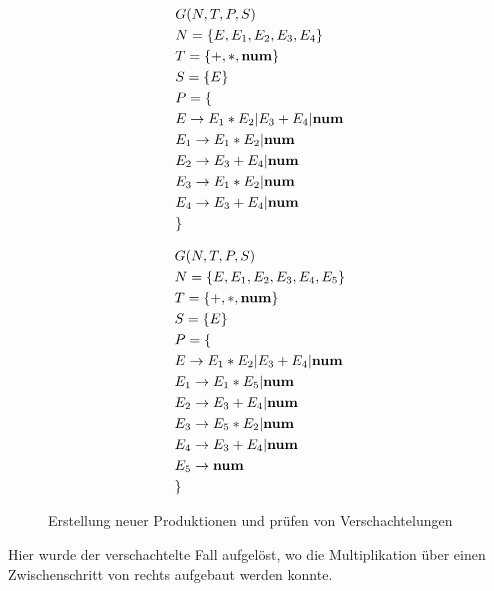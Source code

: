 \documentclass[runningheads]{llncs}
\begin{document}
	\begin{figure}
		\begin{minipage}{0.48\textwidth}
			\begin{flushleft}
				\begin{align*}
					& G(N,T,P,S) \\
					& N= \{E, E_1, E_2, E_3, E_4\} \\
					& T= \{+, *, \bold{num}\} \\
					& S= \{E\} \\
					& P = \{ \\
					& E     \rightarrow E_1 * E_2 | E_3 + E_4 | \bold{num} \\
					& E_1   \rightarrow E_1 * E_2 | \bold{num} \\
					& E_2   \rightarrow E_3 + E_4 | \bold{num} \\
					& E_3   \rightarrow E_1 * E_2 | \bold{num} \\
					& E_4   \rightarrow E_3 + E_4 | \bold{num} \\
					& \}
				\end{align*}
			\end{flushleft}
		\end{minipage}
		\hfill
		\begin{minipage}{0.48\textwidth}
			\begin{align*}
				& G(N,T,P,S) \\
				& N= \{E, E_1, E_2, E_3, E_4, E_5\} \\
				& T= \{+, *, \bold{num}\} \\
				& S= \{E\} \\
				& P = \{ \\
				& E     \rightarrow E_1 * E_2 | E_3 + E_4 | \bold{num} \\
				& E_1   \rightarrow E_1 * E_5 | \bold{num} \\
				& E_2   \rightarrow E_3 + E_4 | \bold{num} \\
				& E_3   \rightarrow E_5 * E_2 | \bold{num} \\
				& E_4   \rightarrow E_3 + E_4 | \bold{num} \\
				& E_5   \rightarrow \bold{num} \\
				& \}
			\end{align*}
		\end{minipage}
		\caption{Erstellung neuer Produktionen und prüfen von Verschachtelungen}
		\label{fig:figure9}
	\end{figure}

	Hier wurde der verschachtelte Fall aufgelöst,
	wo die Multiplikation über einen Zwischenschritt von rechts aufgebaut werden konnte.
\end{document}
